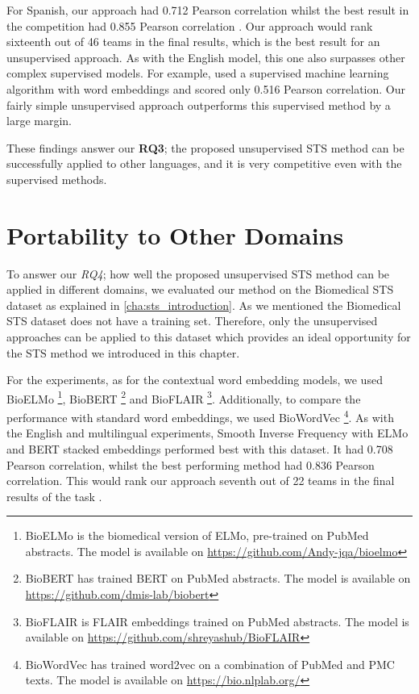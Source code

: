 For Spanish, our approach had 0.712 Pearson correlation whilst the best result \autocite{tian-etal-2017-ecnu} in the competition had 0.855 Pearson correlation \autocite{cer-etal-2017-semeval}. Our approach would rank sixteenth out of 46 teams in the final results, which is the best result for an unsupervised approach. As with the English model, this one also surpasses other complex supervised models. For example, \textcite{barrow-peskov-2017-umdeep} used a supervised machine learning algorithm with word embeddings and scored only 0.516 Pearson correlation. Our fairly simple unsupervised approach outperforms this supervised method by a large margin. 

These findings answer our \textbf{RQ3}; the proposed unsupervised STS method can be successfully applied to other languages, and it is very competitive even with the supervised methods. 


\section{Portability to Other Domains}
\label{sec:state_domains}
To answer our \textit{RQ4}; how well the proposed unsupervised STS method can be applied in different domains, we evaluated our method on the Biomedical STS dataset as explained in \ref{cha:sts_introduction}. As we mentioned the Biomedical STS dataset does not have a training set. Therefore, only the unsupervised approaches can be applied to this dataset which provides an ideal opportunity for the STS method we introduced in this chapter. 

For the experiments, as for the contextual word embedding models, we used BioELMo \autocite{jin2019probing}\footnote{BioELMo is the biomedical version of ELMo, pre-trained on PubMed abstracts. The model is available on \url{https://github.com/Andy-jqa/bioelmo}}, BioBERT \autocite{10.1093/bioinformatics/btz682}\footnote{BioBERT has trained BERT on PubMed abstracts. The model is available on \url{https://github.com/dmis-lab/biobert}} and BioFLAIR \autocite{sharma2019bioflair}\footnote{BioFLAIR is FLAIR embeddings trained on PubMed abstracts. The model is available on \url{https://github.com/shreyashub/BioFLAIR}}. Additionally, to compare the performance with standard word embeddings, we used BioWordVec \autocite{Zhang2019}\footnote{BioWordVec has trained word2vec on a combination of PubMed and PMC texts. The model is available on \url{https://bio.nlplab.org/}}. As with the English and multilingual experiments, Smooth Inverse Frequency with ELMo and BERT stacked embeddings performed best with this dataset. It had 0.708 Pearson correlation, whilst the best performing method had 0.836 Pearson correlation. This would rank our approach seventh out of 22 teams in the final results of the task \autocite{10.1093/bioinformatics/btx238}.

